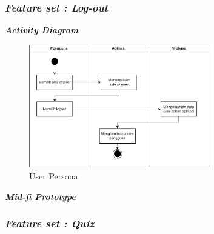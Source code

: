 \subsubsection{\textit{Feature set : Log-out}}

\textbf{\textit{Activity Diagram}}
\begin{figure}[H]
	\centering
	\includegraphics[width=0.7\textwidth]{contents/chapter-3/images/AD-signout.png}
	\caption[Caption]{User Persona}
	\label{Fig:UserPersona}
\end{figure}

\textbf{\textit{Mid-fi Prototype}}

\subsubsection{\textit{Feature set : Quiz}}


